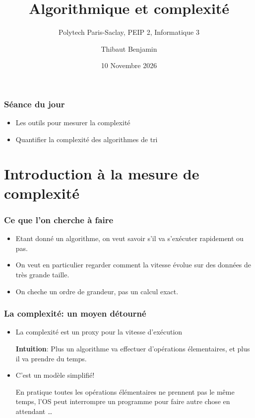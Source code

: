 \documentclass[aspectratio=169]{beamer}
\title{Algorithmique et complexité}
\subtitle{Polytech Paris-Saclay, PEIP 2, Informatique 3}
\author{Thibaut Benjamin}
\date{10 Novembre 2026}
\institute{Amphi 2}
\begin{document}
\maketitle

\begin{frame}
  \frametitle{Séance du jour}

  \begin{itemize}
  \item Les outils pour mesurer la complexité
  \item Quantifier la complexité des algorithmes de tri
  \end{itemize}

\end{frame}

\section{Introduction à la mesure de complexité}

\begin{frame}[fragile]
  \frametitle{Ce que l'on cherche à faire}

  \begin{itemize}
  \item Etant donné un algorithme, on veut savoir s'il va s'exécuter rapidement
    ou pas.
  \item On veut en particulier regarder comment la vitesse évolue sur des
    données de \alert{très grande taille}.
  \item On cheche un \alert{ordre de grandeur}, pas un calcul exact.
  \end{itemize}

\end{frame}

\begin{frame}[fragile]
  \frametitle{La complexité: un moyen détourné}

  \begin{itemize}
  \item La complexité est un \alert{proxy} pour la vitesse d'exécution

    \alert{\textbf{Intuition}: Plus un algorithme va effectuer d'opérations
    élementaires, et plus il va prendre du temps.}

  \item C'est un modèle simplifié!

    \alert{En pratique toutes les \og opérations élémentaires\fg{} ne prennent
      pas le même temps, l'OS peut interrompre un programme pour faire autre
      chose en attendant \ldots}

  \end{itemize}

\end{frame}
\end{document}
